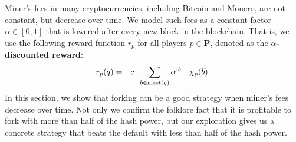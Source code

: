 \documentclass[a4paper,english,cleveref, autoref,numberwithinsect]{lipics-v2019}
\newcommand{\juan}[1]{{\textcolor{violet} {\bf Juan: #1}}}
\newcommand{\bP}{\mathbf{P}}
\newcommand{\meet}{\text{\rm meet}}
\newcommand{\rpa}{r_p}
\begin{document}
Miner's fees in many cryptocurrencies, including Bitcoin and Monero, are not constant, but decrease over time.
We model such 
fees as a constant factor $\alpha \in [0,1]$ that is lowered after every new block in the blockchain. That is, 
we use the following reward function $\rpa$ for all players $p \in \bP$, denoted as the \textbf{$\alpha$-discounted reward}: 
\begin{eqnarray*}
\rpa(q) & = & 
c \cdot \sum_{b \in \meet(q)} \alpha^{|b|} \cdot \chi_p(b).
\end{eqnarray*}
In this section, we show that forking can be a good strategy when miner's fees decrease over time. 
Not only we confirm the folklore fact that it is profitable to fork with more than half of the hash power, but our exploration %
gives us a concrete strategy that 
beats the default with less than half of the hash power.
\end{document}
